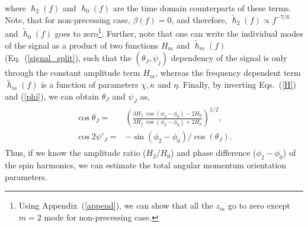 \documentclass[preprint,onecolumn,,tightenlines,superscriptaddress,showpacs,nofootinbib,eqsecnum,amsfonts,amsmath]{revtex4}
\begin{document}
where $\hslash_{2}(f)$ and $\hslash_{0}(f)$ are the time domain counterparts of these terms. Note, 
that for non-precessing case, $\beta(f)=0$, and therefore, $\tilde \hslash_{2}(f) \propto f^{-7/6}$ and 
$\tilde \hslash_{0}(f)$ goes to zero\footnote{Using Appendix~(\ref{append}), we can show that all
the $z_m$ go to zero except $m=2$ mode for non-precessing case.}. Further, note that one can write the 
individual modes of the signal as a product of two functions $H_m$ and $\tilde \hslash_{m}(f)$ (Eq.~(\ref{signal_split}), 
such  that the $(\theta_J, \psi_j)$ dependency of the signal is only through the constant amplitude term $H_m$, 
whereas the frequency dependent term $\tilde \hslash_{m}(f)$ is a function of parameters $\chi,\kappa$ and $\eta$. Finally, by 
inverting  Eqs.~(\ref{H}) and (\ref{phi}), we can obtain $\theta_J$ and $\psi_J$ as,
\begin{align}
\begin{split}
\cos\theta_J =& \left(\frac{3H_2~ \cos(\phi_2-\phi_0)-2 H_0}{3H_2~ \cos(\phi_2-\phi_0)+2 H_0}\right)^{1/2}, \\
\cos 2\psi'_J =& -\sin (\phi_2-\phi_0)/ \cos(\theta_J).
\label{theta_J}
\end{split}
\end{align}
Thus, if we know the amplitude ratio ($H_2/H_0$) and phase difference ($\phi_2 - \phi_0$) of the spin harmonics, 
we can estimate the total angular momentum orientation parameters.
\end{document}
